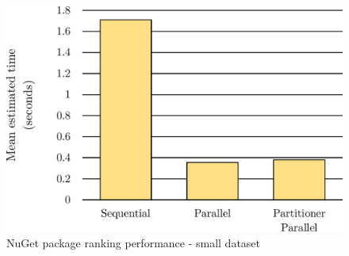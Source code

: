 \begin{figure}[htb]
\centering
\includegraphics[width=.62\linewidth]{figures04/NugetSmall.pdf}
\caption{NuGet package ranking performance - small dataset}
\label{fig:NugetPerfSmall}
\end{figure}

